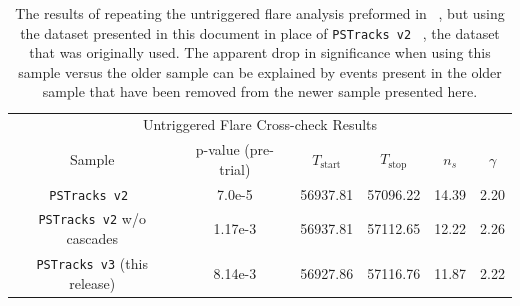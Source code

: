 \documentclass[aps,10pt,prd,twocolumn,floats,letterpaper,showpacs,nofootinbib,bibnotes,notitlepage,superscriptaddress,floatfix]{revtex4-1}
\newcommand{\MA}[1]{{\color{black}#1}}
\begin{document}
\begin{table}[p]
\centering
\begin{ruledtabular}
\begin{tabular}{cccccc}
\multicolumn{6}{c}{Untriggered Flare Cross-check Results} \\[0.1cm]
Sample & p-value (pre-trial) & $T_\text{start}$ & $T_\text{stop}$ & $n_s$ & $\gamma$ \\ 
\MA{\tt PSTracks v2}~\cite{IceCube:2018cha,IceCube:2019} & 7.0e-5 & 56937.81 & 57096.22 & 14.39 & 2.20  \\
\MA{\tt PSTracks v2} w/o cascades & 1.17e-3 & 56937.81 & 57112.65 & 12.22 & 2.26 \\
\MA{\tt PSTracks v3} (this release) & 8.14e-3 & 56927.86 & 57116.76 & 11.87 & 2.22\\
\end{tabular}
\end{ruledtabular}
\caption[]{The results of repeating the untriggered flare analysis preformed in ~\cite{IceCube:2018cha}, but using the dataset presented in this document in place of {\tt PSTracks v2} ~\cite{IceCube:2019}, the dataset that was originally used. The apparent drop in significance when using this sample versus the older sample can be explained by events present in the older sample that have been removed from the newer sample presented here.}\label{tab:TXSCrossChecks}
\end{table}
\end{document}
